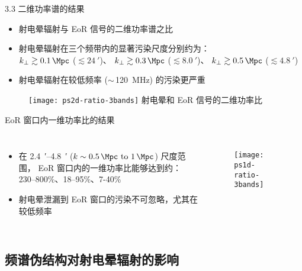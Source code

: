 \documentclass{beamer}
\begin{document}
\begin{frame}{3.3 二维功率谱的结果}
  \begin{itemize}
    \item 射电晕辐射与 EoR 信号的\alert{二维功率谱之比}
    \item 射电晕辐射在三个频带内的显著污染尺度分别约为：\\
      $k_{\perp} \gtrsim \SI{0.1}{\per\Mpc}$
      ($\lesssim \SI{24}{\arcminute}$)、
      $k_{\perp} \gtrsim \SI{0.3}{\per\Mpc}$
      ($\lesssim \SI{8.0}{\arcminute}$)、
      $k_{\perp} \gtrsim \SI{0.5}{\per\Mpc}$
      ($\lesssim \SI{4.8}{\arcminute}$)
    \item 射电晕辐射在较低频率 ($\sim$\,\SI{120}{\MHz}) 的污染更严重
  \end{itemize}

  \begin{figure}
    \centering\footnotesize
    \texttt{[image: ps2d-ratio-3bands]}
    射电晕和 EoR 信号的二维功率比
  \end{figure}
\end{frame}

\begin{frame}[t]
  \begin{alertblock}{EoR 窗口内一维功率比的结果}
  \end{alertblock}
  \begin{columns}
    \begin{itemize}
      \item 在 \SI{2.4}{\arcminute}--\SI{4.8}{\arcminute}
        ($k \sim \SIrange{0.5}{1}{\per\Mpc}$) 尺度范围，
        EoR 窗口内的一维功率比能够达到约：
        230--800\%、18--95\%、7-40\%
      \item 射电晕泄漏到 EoR 窗口的污染不可忽略，尤其在较低频率
    \end{itemize}

    \begin{figure}
      \centering
      \texttt{[image: ps1d-ratio-3bands]}
    \end{figure}
  \end{columns}
\end{frame}

\subsection{频谱伪结构对射电晕辐射的影响}
\end{document}

